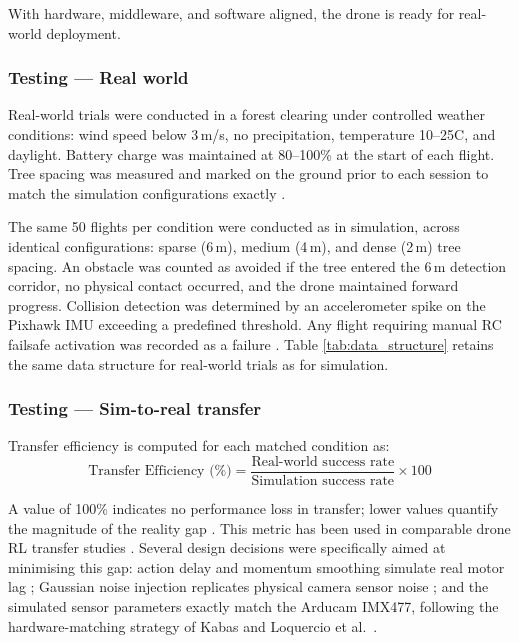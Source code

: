 \documentclass[../main.tex]{subfiles}
\begin{document}
With hardware, middleware, and software aligned, the drone is ready for real-world deployment.



\subsubsection{Testing --- Real world}

Real-world trials were conducted in a forest clearing under controlled weather conditions: wind speed below 3\,m/s, no precipitation, temperature 10--25\textdegree{}C, and daylight. Battery charge was maintained at 80--100\% at the start of each flight. Tree spacing was measured and marked on the ground prior to each session to match the simulation configurations exactly \cite{Loquercio2019,Jang2024}.

The same 50 flights per condition were conducted as in simulation, across identical configurations: sparse (6\,m), medium (4\,m), and dense (2\,m) tree spacing. An obstacle was counted as avoided if the tree entered the 6\,m detection corridor, no physical contact occurred, and the drone maintained forward progress. Collision detection was determined by an accelerometer spike on the Pixhawk IMU exceeding a predefined threshold. Any flight requiring manual RC failsafe activation was recorded as a failure \cite{Azzam2024}. Table \ref{tab:data_structure} retains the same data structure for real-world trials as for simulation.

\subsubsection{Testing --- Sim-to-real transfer}

Transfer efficiency is computed for each matched condition as:
\begin{equation}
    \text{Transfer Efficiency (\%)} = \frac{\text{Real-world success rate}}{\text{Simulation success rate}} \times 100
\end{equation}

A value of 100\% indicates no performance loss in transfer; lower values quantify the magnitude of the reality gap \cite{Zhao2020,Salvato2021}. This metric has been used in comparable drone RL transfer studies \cite{Loquercio2019,Azzam2024,Jang2024}. Several design decisions were specifically aimed at minimising this gap: action delay and momentum smoothing simulate real motor lag \cite{Zhao2020,Salvato2021}; Gaussian noise injection replicates physical camera sensor noise \cite{Loquercio2019}; and the simulated sensor parameters exactly match the Arducam IMX477, following the hardware-matching strategy of Kabas \cite{Kabas2022} and Loquercio et al.\ \cite{Loquercio2019}.
\end{document}
